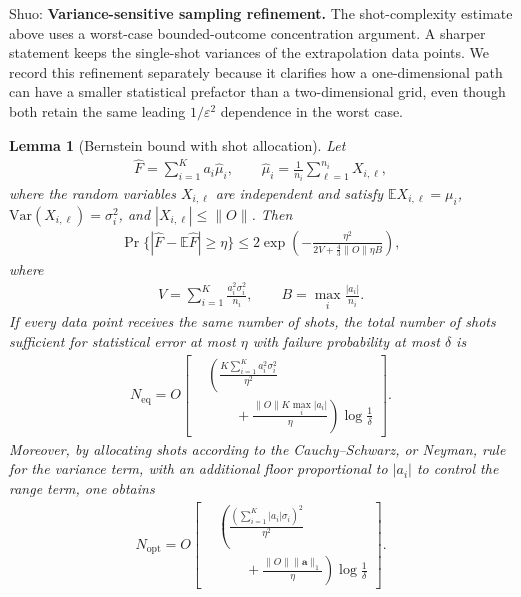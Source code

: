 \documentclass[aps,pra,reprint,groupedaddress,floatfix]{revtex4-2}
\newtheorem{lemma}{Lemma}
\newcommand{\eps}{\varepsilon}
\newcommand{\mb}{\mathbb}
\newcommand{\sz}[1]{{\color{blue} Shuo: #1}}
\begin{document}
\sz{\textbf{Variance-sensitive sampling refinement.}
The shot-complexity estimate above uses a worst-case bounded-outcome concentration argument. A sharper statement keeps the single-shot variances of the extrapolation data points. We record this refinement separately because it clarifies how a one-dimensional path can have a smaller statistical prefactor than a two-dimensional grid, even though both retain the same leading $1/\eps^2$ dependence in the worst case.}

\begin{lemma}[Bernstein bound with shot allocation]
\label{lem:bernstein-shot-allocation}
Let
\begin{equation*}
\begin{gathered}
    \widehat F=\sum_{i=1}^{K}a_i\widehat \mu_i,
    \qquad
    \widehat\mu_i=\frac{1}{n_i}\sum_{\ell=1}^{n_i}X_{i,\ell},
\end{gathered}
\end{equation*}
\vspace{0.4em}
where the random variables $X_{i,\ell}$ are independent and satisfy
$\mb E X_{i,\ell}=\mu_i$, $\mathrm{Var}(X_{i,\ell})=\sigma_i^2$, and
$|X_{i,\ell}|\le \|O\|$.
Then
\begin{align}
\label{eq:bernstein-linear-estimator}
    \Pr\{|\widehat F-\mb E\widehat F|\ge \eta\}
    \le
    2\exp\left(
    -\frac{\eta^2}{2V+\frac{4}{3}\|O\|\eta B}
    \right),
\end{align}
where
\begin{align*}
    V=\sum_{i=1}^{K}\frac{a_i^2\sigma_i^2}{n_i},
    \qquad
    B=\max_i\frac{|a_i|}{n_i}.
\end{align*}
If every data point receives the same number of shots, the total number of shots sufficient for statistical error at most $\eta$ with failure probability at most $\delta$ is
\begin{align}
\label{eq:equal-shot-bound}
    N_{\mathrm{eq}}
    =
    O\left[
    \begin{aligned}
    &\left(
    \frac{K\sum_{i=1}^K a_i^2\sigma_i^2}{\eta^2}\right.\\
    &\left.\qquad+
    \frac{\|O\|K\max_i|a_i|}{\eta}
    \right)\log\frac{1}{\delta}
    \end{aligned}
    \right].
\end{align}
Moreover, by allocating shots according to the Cauchy--Schwarz, or Neyman, rule for the variance term, with an additional floor proportional to $|a_i|$ to control the range term, one obtains
\begin{align}
\label{eq:optimized-shot-bound}
    N_{\mathrm{opt}}
    =
    O\left[
    \begin{aligned}
    &\left(
    \frac{\left(\sum_{i=1}^{K}|a_i|\sigma_i\right)^2}{\eta^2}\right.\\
    &\left.\qquad+
    \frac{\|O\|\|\mathbf a\|_1}{\eta}
    \right)\log\frac{1}{\delta}
    \end{aligned}
    \right].
\end{align}
\end{lemma}
\end{document}
